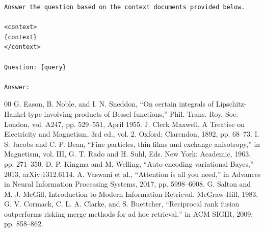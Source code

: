 \documentclass[conference]{IEEEtran}
\begin{document}
\begin{lstlisting}[caption=RAG User Template, label=lst:rag_user_template]
Answer the question based on the context documents provided below.

<context>
{context}
</context>

Question: {query}

Answer:
\end{lstlisting}

\begin{thebibliography}{00}
 G. Eason, B. Noble, and I. N. Sneddon, ``On certain integrals of Lipschitz-Hankel type involving products of Bessel functions,'' Phil. Trans. Roy. Soc. London, vol. A247, pp. 529--551, April 1955.
 J. Clerk Maxwell, A Treatise on Electricity and Magnetism, 3rd ed., vol. 2. Oxford: Clarendon, 1892, pp. 68--73.
 I. S. Jacobs and C. P. Bean, ``Fine particles, thin films and exchange anisotropy,'' in Magnetism, vol. III, G. T. Rado and H. Suhl, Eds. New York: Academic, 1963, pp. 271--350.
 D. P. Kingma and M. Welling, ``Auto-encoding variational Bayes,'' 2013, arXiv:1312.6114.
 A. Vaswani et al., ``Attention is all you need,'' in Advances in Neural Information Processing Systems, 2017, pp. 5998--6008.
 G. Salton and M. J. McGill, Introduction to Modern Information Retrieval. McGraw-Hill, 1983.
 G. V. Cormack, C. L. A. Clarke, and S. Buettcher, ``Reciprocal rank fusion outperforms risking merge methods for ad hoc retrieval,'' in ACM SIGIR, 2009, pp. 858--862.
\end{thebibliography}
\end{document}
